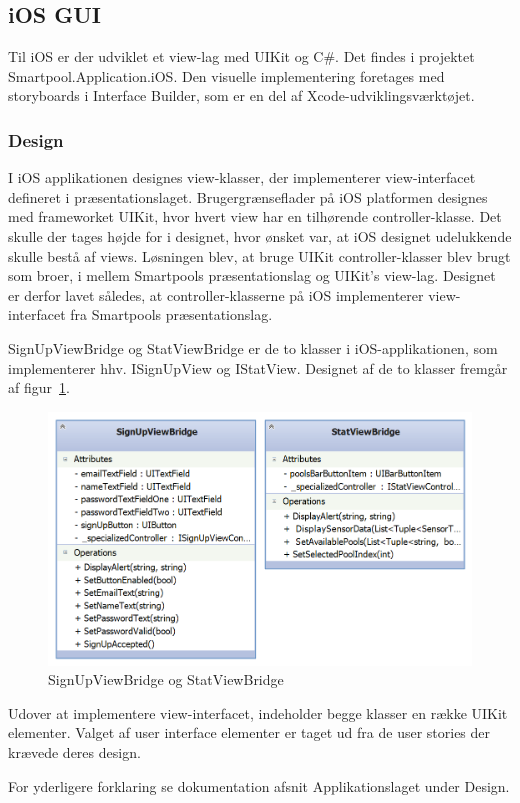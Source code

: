 \subsection{iOS GUI}
Til iOS er der udviklet et view-lag med UIKit og C\#. Det findes i projektet Smartpool.Application.iOS.
Den visuelle implementering foretages med storyboards i Interface Builder, som er en del af Xcode-udviklingsværktøjet.

\subsubsection{Design}
I iOS applikationen designes view-klasser, der implementerer view-interfacet defineret i præsentationslaget. Brugergrænseflader på iOS platformen designes med frameworket UIKit, hvor hvert view har en tilhørende controller-klasse. Det skulle der tages højde for i designet, hvor ønsket var, at iOS designet udelukkende skulle bestå af views. Løsningen blev, at bruge UIKit controller-klasser blev brugt som broer, i mellem Smartpools præsentationslag og UIKit's view-lag. Designet er derfor lavet således, at controller-klasserne på iOS implementerer view-interfacet fra Smartpools præsentationslag.

SignUpViewBridge og StatViewBridge er de to klasser i iOS-applikationen, som implementerer hhv. ISignUpView og IStatView. Designet af de to klasser fremgår af figur~\ref{fig:ios_viewbridges}.

\begin{figure}
	\centering
	\includegraphics[width=0.7\linewidth]{figs/design/ios_viewbridges}
	\caption{SignUpViewBridge og StatViewBridge}
	\label{fig:ios_viewbridges}
\end{figure}

Udover at implementere view-interfacet, indeholder begge klasser en række UIKit elementer. Valget af user interface elementer er taget ud fra de user stories der krævede deres design.

For yderligere forklaring se dokumentation afsnit Applikationslaget under Design.